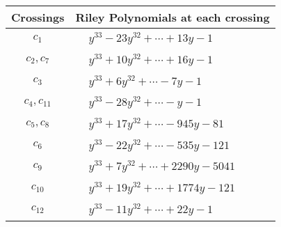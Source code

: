\documentclass[1p]{elsarticle_modified}
\theoremstyle{definition}
\begin{document}
\begin{tabular}{m{50pt}|m{274pt}}
Crossings & \hspace{64pt}Riley Polynomials at each crossing \\
\hline $$\begin{aligned}c_{1}\end{aligned}$$&$\begin{aligned}
&y^{33}-23 y^{32}+\cdots+13 y-1
\end{aligned}$\\
\hline $$\begin{aligned}c_{2},c_{7}\end{aligned}$$&$\begin{aligned}
&y^{33}+10 y^{32}+\cdots+16 y-1
\end{aligned}$\\
\hline $$\begin{aligned}c_{3}\end{aligned}$$&$\begin{aligned}
&y^{33}+6 y^{32}+\cdots-7 y-1
\end{aligned}$\\
\hline $$\begin{aligned}c_{4},c_{11}\end{aligned}$$&$\begin{aligned}
&y^{33}-28 y^{32}+\cdots- y-1
\end{aligned}$\\
\hline $$\begin{aligned}c_{5},c_{8}\end{aligned}$$&$\begin{aligned}
&y^{33}+17 y^{32}+\cdots-945 y-81
\end{aligned}$\\
\hline $$\begin{aligned}c_{6}\end{aligned}$$&$\begin{aligned}
&y^{33}-22 y^{32}+\cdots-535 y-121
\end{aligned}$\\
\hline $$\begin{aligned}c_{9}\end{aligned}$$&$\begin{aligned}
&y^{33}+7 y^{32}+\cdots+2290 y-5041
\end{aligned}$\\
\hline $$\begin{aligned}c_{10}\end{aligned}$$&$\begin{aligned}
&y^{33}+19 y^{32}+\cdots+1774 y-121
\end{aligned}$\\
\hline $$\begin{aligned}c_{12}\end{aligned}$$&$\begin{aligned}
&y^{33}-11 y^{32}+\cdots+22 y-1
\end{aligned}$\\
\hline
\end{tabular}\\~\\
\end{document}
